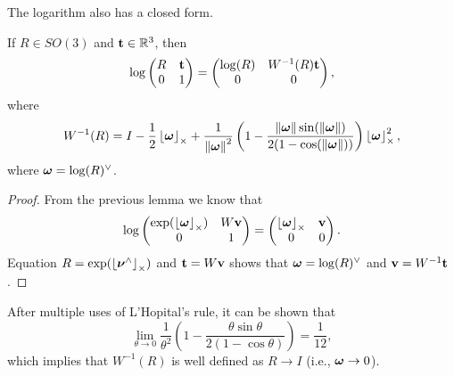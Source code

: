 The logarithm also has a closed form.
\begin{lemma}
If $R\in SO(3)$ and $\mathbf{t}\in\mathbb{R}^3$, then
\[
\log\begin{pmatrix} R & \mathbf{t} \\ 0 & 1 \end{pmatrix} = \begin{pmatrix}\log(R) & W^{-1}(R)\mathbf{t} \\ 0 & 0 \end{pmatrix},
\]
where
\[
W^{-1}(R) = I - \frac{1}{2}\left\lfloor\boldsymbol{\omega}\right\rfloor_{\times} + \frac{1}{\left\|\boldsymbol{\omega}\right\|^2}\left(1-\frac{\left\|\boldsymbol{\omega}\right\|\sin(\left\|\boldsymbol{\omega}\right\|)}{2(1-\cos(\left\|\boldsymbol{\omega}\right\|))}\right)\left\lfloor\boldsymbol{\omega}\right\rfloor_{\times}^2,
\]
where $\boldsymbol{\omega} = \log(R)^\vee$.
\end{lemma}
\begin{proof}
From the previous lemma we know that
\[
\log\begin{pmatrix} \exp(\left\lfloor\boldsymbol{\omega}\right\rfloor_{\times}) & W\mathbf{v} \\ 0 & 1 \end{pmatrix} 
= \begin{pmatrix} \left\lfloor\boldsymbol{\omega}\right\rfloor_{\times} & \mathbf{v} \\ 0 & 0 \end{pmatrix}.
\]
Equation $R=\exp(\left\lfloor\boldsymbol{\nu}^\wedge\right\rfloor_{\times})$ and $\mathbf{t} = W\mathbf{v}$ shows that $\boldsymbol{\omega}=\log(R)^\vee$ and $\mathbf{v}=W^{-1}\mathbf{t}$.
\end{proof}
After multiple uses of L'Hopital's rule, it can be shown that 
\[
\lim_{\theta\to 0} \frac{1}{\theta^2}\left(1 - \frac{\theta\sin\theta}{2(1-\cos\theta)}\right) = \frac{1}{12},
\]
which implies that $W^{-1}(R)$ is well defined as $R\to I$ (i.e., $\boldsymbol{\omega}\to 0$).


